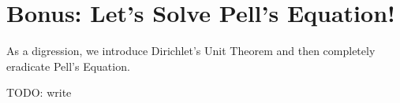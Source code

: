\chapter{Bonus: Let's Solve Pell's Equation!}
As a digression, we introduce Dirichlet's Unit Theorem and
then completely eradicate Pell's Equation.

TODO: write
